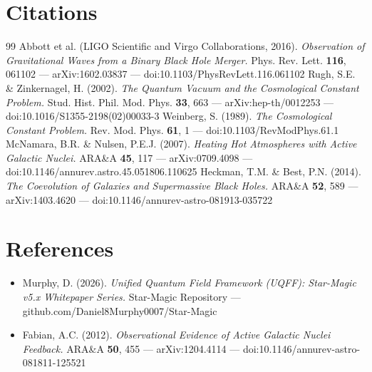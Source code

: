 \documentclass[12pt,a4paper]{article}
\begin{document}
\section*{Citations}
\begin{thebibliography}{99}
 Abbott et al. (LIGO Scientific and Virgo Collaborations, 2016). \emph{Observation of Gravitational Waves from a Binary Black Hole Merger.} Phys. Rev. Lett. \textbf{116}, 061102 --- arXiv:1602.03837 --- doi:10.1103/PhysRevLett.116.061102
 Rugh, S.E. \& Zinkernagel, H. (2002). \emph{The Quantum Vacuum and the Cosmological Constant Problem.} Stud. Hist. Phil. Mod. Phys. \textbf{33}, 663 --- arXiv:hep-th/0012253 --- doi:10.1016/S1355-2198(02)00033-3
 Weinberg, S. (1989). \emph{The Cosmological Constant Problem.} Rev. Mod. Phys. \textbf{61}, 1 --- doi:10.1103/RevModPhys.61.1
 McNamara, B.R. \& Nulsen, P.E.J. (2007). \emph{Heating Hot Atmospheres with Active Galactic Nuclei.} ARA\&A \textbf{45}, 117 --- arXiv:0709.4098 --- doi:10.1146/annurev.astro.45.051806.110625
 Heckman, T.M. \& Best, P.N. (2014). \emph{The Coevolution of Galaxies and Supermassive Black Holes.} ARA\&A \textbf{52}, 589 --- arXiv:1403.4620 --- doi:10.1146/annurev-astro-081913-035722
\end{thebibliography}

\section*{References}
\begin{itemize}
  \item[2.] Murphy, D. (2026). \emph{Unified Quantum Field Framework (UQFF): Star-Magic v5.x Whitepaper Series.} Star-Magic Repository --- github.com/Daniel8Murphy0007/Star-Magic
  \item[5.] Fabian, A.C. (2012). \emph{Observational Evidence of Active Galactic Nuclei Feedback.} ARA\&A \textbf{50}, 455 --- arXiv:1204.4114 --- doi:10.1146/annurev-astro-081811-125521
\end{itemize}

\end{document}
